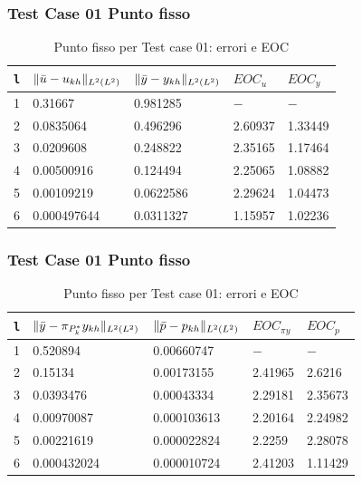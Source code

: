 \documentclass{beamer}
\theoremstyle{definition}
\theoremstyle{remark}
\theoremstyle{plain}
\theoremstyle{definition}
\DeclarePairedDelimiter{\norma}{\lVert}{\rVert}
\begin{document}
\begin{frame}
\frametitle{Test Case 01 Punto fisso}
\begin{table}
\caption{Punto fisso per Test case 01: errori e EOC }
\label{puntofissoI}
\centering

\begin{tabular}{cllll}
\toprule
{\texttt{l}}           &  {$ \norma{\bar{u}-u_{kh}}_{L^2(L^2)} $} &  {$ \norma{\bar{y}-y_{kh}}_{L^2(L^2)} $} &  {$ EOC_u $} &  {$ EOC_y $} \\
\midrule
1            &  0.31667 &  0.981285 &  {$-$} &  {$-$} \\
2            &  0.0835064 &  0.496296 &  2.60937 &  1.33449 \\
3            &  0.0209608 &  0.248822 &  2.35165 &  1.17464 \\
4            &  0.00500916 &  0.124494 &  2.25065 &  1.08882 \\
5            &  0.00109219  &  0.0622586 &  2.29624 &  1.04473 \\
6            &  0.000497644 &  0.0311327 &  1.15957 &  1.02236 \\
\bottomrule
\end{tabular}              
\end{table}

\end{frame}

\begin{frame}
\frametitle{Test Case 01 Punto fisso}

\begin{table}
\caption{Punto fisso per Test case 01: errori e EOC }
\label{puntofissoIbis}
\centering

\begin{tabular}{cllll}
\toprule
{\texttt{l}}           &  {$ \norma{\bar{y}-\pi_{P^*_k}y_{kh}}_{L^2(L^2)} $} &  {$ \norma{\bar{p}-p_{kh}}_{L^2(L^2)} $} &  {$ EOC_{\pi y} $} &  {$ EOC_p $} \\
\midrule
1            &  0.520894 &  0.00660747 &  {$-$} &  {$-$} \\
2            &  0.15134 &  0.00173155 &  2.41965 &  2.6216 \\
3            &  0.0393476 &  0.00043334 &  2.29181 &  2.35673 \\
4            &  0.00970087 &  0.000103613 &  2.20164 &  2.24982 \\
5            &  0.00221619 &  0.000022824 &  2.2259 &  2.28078 \\
6            &  0.000432024 &  0.000010724 &  2.41203 &  1.11429 \\
\bottomrule
\end{tabular}              
\end{table}

\end{frame}
\end{document}
